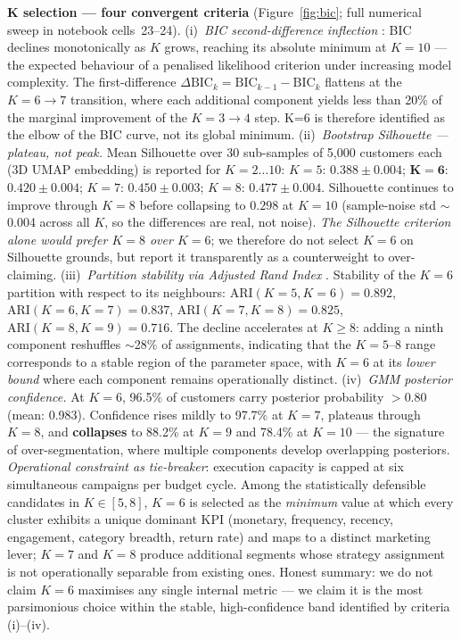 \documentclass[10pt,a4paper]{article}
\begin{document}
\textbf{K selection --- four convergent criteria} (Figure~\ref{fig:bic}; full numerical
sweep in notebook cells~23--24).
(i)~\textit{BIC second-difference inflection} \cite{schwarz1978bic}: BIC declines
monotonically as
$K$ grows, reaching its absolute minimum at $K=10$ --- the expected behaviour of a
penalised likelihood criterion under increasing model complexity. The first-difference
$\Delta\text{BIC}_k = \text{BIC}_{k-1} - \text{BIC}_k$ flattens at the $K=6\!\to\!7$
transition, where each additional component yields less than 20\% of the marginal
improvement of the $K=3\!\to\!4$ step. K=6 is therefore identified as the elbow of
the BIC curve, not its global minimum.
(ii)~\textit{Bootstrap Silhouette --- plateau, not peak.} Mean Silhouette over 30
sub-samples of 5{,}000 customers each (3D UMAP embedding) is reported for $K=2\ldots10$:
$K=5$: $0.388\!\pm\!0.004$; $\boldsymbol{K=6}$: $\boldsymbol{0.420\!\pm\!0.004}$;
$K=7$: $0.450\!\pm\!0.003$; $K=8$: $0.477\!\pm\!0.004$. Silhouette continues to
improve through $K=8$ before collapsing to $0.298$ at $K=10$ (sample-noise std $\sim$0.004
across all $K$, so the differences are real, not noise). \emph{The Silhouette criterion
alone would prefer $K{=}8$ over $K{=}6$}; we therefore do not select $K=6$ on Silhouette
grounds, but report it transparently as a counterweight to over-claiming.
(iii)~\textit{Partition stability via Adjusted Rand Index} \cite{hubert1985ari}.
Stability of the $K{=}6$
partition with respect to its neighbours: $\mathrm{ARI}(K{=}5,K{=}6)=0.892$,
$\mathrm{ARI}(K{=}6,K{=}7)=0.837$, $\mathrm{ARI}(K{=}7,K{=}8)=0.825$,
$\mathrm{ARI}(K{=}8,K{=}9)=0.716$. The decline accelerates at $K\geq 8$: adding a
ninth component reshuffles $\sim$28\% of assignments, indicating that the $K{=}5$--$8$
range corresponds to a stable region of the parameter space, with $K{=}6$ at its
\emph{lower bound} where each component remains operationally distinct.
(iv)~\textit{GMM posterior confidence.} At $K{=}6$, 96.5\% of customers carry
posterior probability $>$0.80 (mean: 0.983). Confidence rises mildly to 97.7\% at
$K{=}7$, plateaus through $K{=}8$, and \textbf{collapses} to 88.2\% at $K{=}9$ and
78.4\% at $K{=}10$ --- the signature of over-segmentation, where multiple components
develop overlapping posteriors.
\textit{Operational constraint as tie-breaker}: execution capacity is capped at six
simultaneous campaigns per budget cycle. Among the statistically defensible candidates
in $K\in[5,8]$, $K=6$ is selected as the \emph{minimum} value at which every cluster
exhibits a unique dominant KPI (monetary, frequency, recency, engagement, category
breadth, return rate) and maps to a distinct marketing lever; $K{=}7$ and $K{=}8$
produce additional segments whose strategy assignment is not operationally separable
from existing ones. Honest summary: we do not claim $K{=}6$ maximises any single
internal metric --- we claim it is the most parsimonious choice within the stable,
high-confidence band identified by criteria (i)--(iv).
\end{document}
